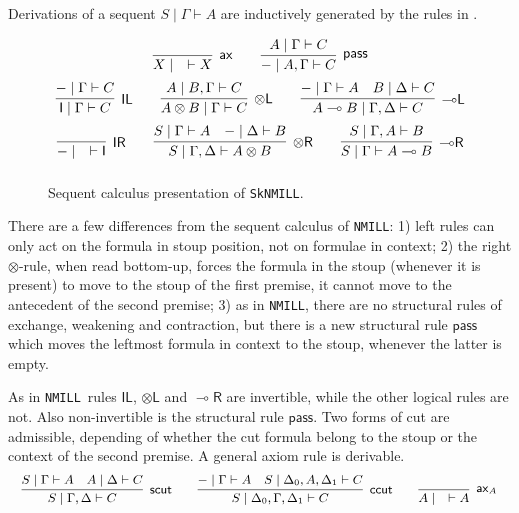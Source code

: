 \documentclass[runningheads]{llncs}
\newcommand{\tl}{\otimes \mathsf{L}}
\newcommand{\tr}{\otimes \mathsf{R}}
\newcommand{\lright}{{\multimap}\mathsf{R}}
\newcommand{\lleft}{{\multimap}\mathsf{L}}
\newcommand{\pass}{\mathsf{pass}}
\newcommand{\unitl}{\mathsf{IL}}
\newcommand{\unitr}{\mathsf{IR}}
\newcommand{\otL}{\tl}
\newcommand{\lolliR}{\lright}
\newcommand{\IL}{\unitl}
\newcommand{\ax}{\mathsf{ax}}
\newcommand{\ot}{\otimes}
\newcommand{\lolli}{\multimap}
\newcommand{\I}{\mathsf{I}}
\newcommand{\NMILL}{\texttt{NMILL}}
\newcommand{\SkNMILL}{\texttt{SkNMILL}}
\begin{document}
Derivations of a sequent $S \mid \Gamma \vdash A$ are inductively generated by the rules in .
\begin{figure}[t]
  \[
  \def\arraystretch{2.5}
  \begin{array}{c}
    \infer[\ax]{X \mid \quad \vdash X}{}
    \qquad
    \infer[\pass]{- \mid A , \Gamma \vdash C}{A \mid \Gamma \vdash C}
    \\
    \infer[\unitl]{\I \mid \Gamma \vdash C}{- \mid \Gamma \vdash C}
    \qquad
    \infer[\tl]{A \ot B \mid \Gamma \vdash C}{A \mid B , \Gamma \vdash C}
    \qquad
    \infer[\lleft]{A \lolli B \mid \Gamma , \Delta \vdash C}{
      - \mid \Gamma \vdash A
      &
      B \mid \Delta \vdash C
    }
    \\
    \infer[\unitr]{- \mid \quad \vdash \I}{}
    \qquad
    \infer[\tr]{S \mid \Gamma , \Delta \vdash A \ot B}{
      S \mid \Gamma \vdash A
      &
      - \mid \Delta \vdash B
    }
    \qquad
    \infer[\lolliR]{S \mid \Gamma \vdash A \lolli B}{S \mid \Gamma , A \vdash B}
  \end{array}
  \]
\caption{Sequent calculus presentation of \SkNMILL.}
\label{fig:seqcalc}  
\end{figure}
There are a few differences from the sequent calculus of \NMILL:
1) left rules can only act on the formula in stoup position, not on formulae in context; 2) the right $\ot$-rule, when read bottom-up, forces the formula in the stoup (whenever it is present) to move to the stoup of the first premise, it cannot move to the antecedent of the second premise; 3) as in \NMILL, there are no structural rules of exchange, weakening and contraction, but there is a new structural rule $\pass$ which moves the leftmost formula in context to the stoup, whenever the latter is empty.

As in \NMILL\, rules $\IL$, $\otL$ and $\lolliR$ are invertible, while the other logical rules are not. Also non-invertible is the structural rule $\pass$.
Two forms of cut are admissible, depending of whether the cut formula belong to the stoup or the context of the second premise. A general axiom rule is derivable.
\[
\small
    \infer[\mathsf{scut}]{S \mid \Gamma , \Delta \vdash C}{
      S \mid \Gamma \vdash A
      &
      A \mid \Delta \vdash C
    }
    \qquad
    \infer[\mathsf{ccut}]{S \mid \Delta_0 , \Gamma , \Delta_1 \vdash C}{
      - \mid \Gamma \vdash A
      &
      S \mid \Delta_0 , A , \Delta_1 \vdash C
    }
    \qquad
    \infer[\ax_A]{A \mid \quad \vdash A}{}
\]
\end{document}
